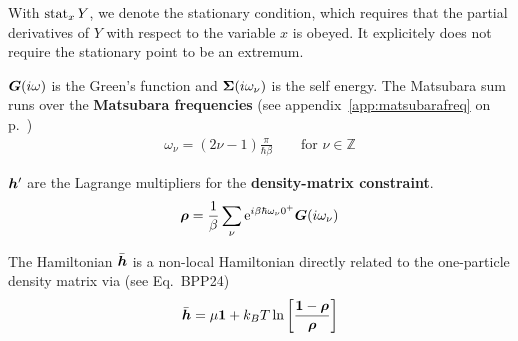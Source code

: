 \documentclass[11pt,a4paper]{report}
\begin{document}
With $\operatorname*{stat}_x Y$, we denote the stationary condition, which requires
that the partial derivatives of $Y$ with respect to the variable $x$ is
obeyed. It explicitely does not require the stationary point to be an
extremum.

$\bm{G}(i\omega)$ is the Green's function and
$\bm{\Sigma}(i\omega_\nu)$ is the self energy.  The Matsubara sum
runs over the \textbf{Matsubara frequencies} (see appendix~\ref{app:matsubarafreq} on
p.~\pageref{app:matsubarafreq})
\begin{eqnarray}
\omega_\nu=(2\nu-1)\frac{\pi}{\hbar\beta}
\qquad\text{for $\nu\in\mathbb{Z}$}
\end{eqnarray}

$\bm{h}'$ are the Lagrange multipliers for the \textbf{density-matrix
  constraint}.
\begin{eqnarray}
\bm{\rho}=\frac{1}{\beta}
\sum_\nu\mathrm{e}^{i\beta\hbar\omega_\nu0^+}\bm{G}(i\omega_\nu)
\label{eq:rhoofg}
\end{eqnarray}

The Hamiltonian $\bar{\bm{h}}$ is a non-local Hamiltonian directly
related to the one-particle density matrix via (see Eq.~BPP24)
\begin{eqnarray}
\bar{\bm{h}}=\mu\bm{1}+k_BT\ln
\left[\frac{\bm{1}-\bm{\rho}}{\bm{\rho}}\right]
\label{eq:defhbar}
\end{eqnarray}
\end{document}
